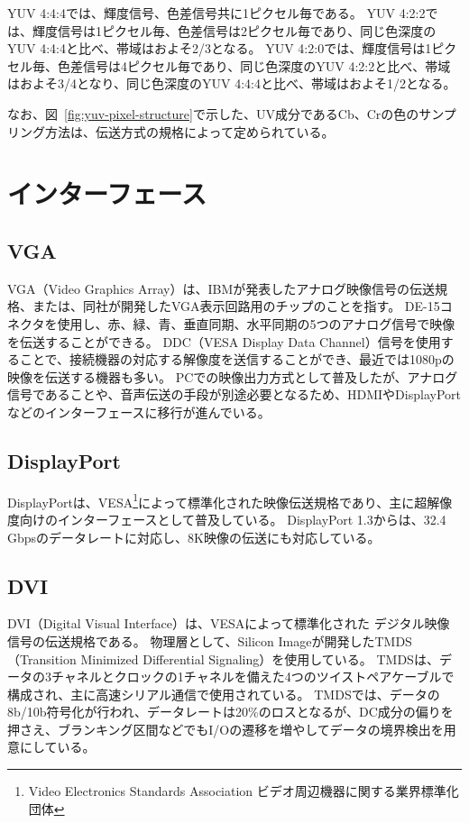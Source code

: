 
YUV 4:4:4では、輝度信号、色差信号共に1ピクセル毎である。
YUV 4:2:2では、輝度信号は1ピクセル毎、色差信号は2ピクセル毎であり、同じ色深度のYUV 4:4:4と比べ、帯域はおよそ2/3となる。
YUV 4:2:0では、輝度信号は1ピクセル毎、色差信号は4ピクセル毎であり、同じ色深度のYUV 4:2:2と比べ、帯域はおよそ3/4となり、同じ色深度のYUV 4:4:4と比べ、帯域はおよそ1/2となる。

なお、図~\ref{fig:yuv-pixel-structure}で示した、UV成分であるCb、Crの色のサンプリング方法は、伝送方式の規格によって定められている。

\section{インターフェース}
\label{sec:interface}

\subsection{VGA}
VGA（Video Graphics Array）は、IBMが発表したアナログ映像信号の伝送規格、または、同社が開発したVGA表示回路用のチップのことを指す。
DE-15コネクタを使用し、赤、緑、青、垂直同期、水平同期の5つのアナログ信号で映像を伝送することができる。
DDC（VESA Display Data Channel）信号を使用することで、接続機器の対応する解像度を送信することができ、最近では1080pの映像を伝送する機器も多い。
PCでの映像出力方式として普及したが、アナログ信号であることや、音声伝送の手段が別途必要となるため、HDMIやDisplayPortなどのインターフェースに移行が進んでいる。

\subsection{DisplayPort}
DisplayPortは、VESA\footnote{Video Electronics Standards Association ビデオ周辺機器に関する業界標準化団体}によって標準化された映像伝送規格であり、主に超解像度向けのインターフェースとして普及している。
DisplayPort 1.3からは、32.4 Gbpsのデータレートに対応し、8K映像の伝送にも対応している。

\subsection{DVI}
DVI（Digital Visual Interface）は、VESA\footnotemark[1]によって標準化された デジタル映像信号の伝送規格である。
物理層として、Silicon Imageが開発したTMDS（Transition Minimized Differential Signaling）を使用している。
TMDSは、データの3チャネルとクロックの1チャネルを備えた4つのツイストペアケーブルで構成され、主に高速シリアル通信で使用されている。
TMDSでは、データの8b/10b符号化が行われ、データレートは20\%のロスとなるが、DC成分の偏りを押さえ、ブランキング区間などでもI/Oの遷移を増やしてデータの境界検出を用意にしている。


